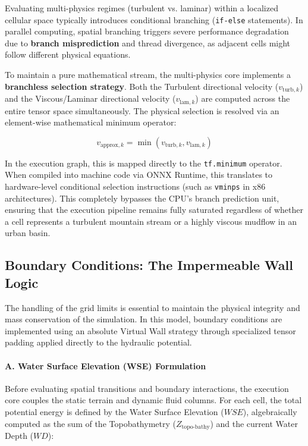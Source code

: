 Evaluating multi-physics regimes (turbulent vs. laminar) within a localized cellular space typically introduces conditional branching 
(\texttt{if-else} statements). In parallel computing, spatial branching triggers severe performance degradation due to 
\textbf{branch misprediction} and thread divergence, as adjacent cells might follow different physical equations.

To maintain a pure mathematical stream, the multi-physics core implements a \textbf{branchless selection strategy}. Both the Turbulent 
directional velocity ($v_{\text{turb}, k}$) and the Viscous/Laminar directional velocity ($v_{\text{lam}, k}$) are computed across the 
entire tensor space simultaneously. The physical selection is resolved via an element-wise mathematical minimum operator:

$$v_{\text{approx}, k} = \min(v_{\text{turb}, k}, v_{\text{lam}, k})$$

In the execution graph, this is mapped directly to the \texttt{tf.minimum} operator. When compiled into machine code via ONNX Runtime, this 
translates to hardware-level conditional selection instructions (such as \texttt{vminps} in x86 architectures). This completely bypasses 
the CPU's branch prediction unit, ensuring that the execution pipeline remains fully saturated regardless of whether a cell represents a 
turbulent mountain stream or a highly viscous mudflow in an urban basin.

\subsection{Boundary Conditions: The Impermeable Wall Logic}

The handling of the grid limits is essential to maintain the physical integrity and mass conservation of the simulation. In this model, 
boundary conditions are implemented using an absolute Virtual Wall strategy through specialized tensor padding applied directly to the 
hydraulic potential.

\paragraph{A. Water Surface Elevation (WSE) Formulation}

Before evaluating spatial transitions and boundary interactions, the execution core couples the static terrain and dynamic fluid columns. 
For each cell, the total potential energy is defined by the Water Surface Elevation ($WSE$), algebraically computed as the sum of the 
Topobathymetry ($Z_{\text{topo-bathy}}$) and the current Water Depth ($WD$):

